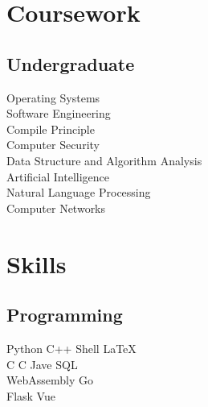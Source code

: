 \documentclass[]{resume}
\begin{document}
\begin{minipage}[t]{0.33\textwidth}
\section{Coursework}

\subsection{Undergraduate}
Operating Systems \\
Software Engineering \\
Compile Principle \\
Computer Security \\
Data Structure and Algorithm Analysis \\
Artificial Intelligence \\
Natural Language Processing \\
Computer Networks \\
\sectionsep


\section{Skills}

\subsection{Programming}
Python \textbullet{} C++ \textbullet{} Shell \textbullet{} \LaTeX\ \\
C \textbullet{} C \textbullet{} Jave \textbullet{} SQL \\
WebAssembly \textbullet{} Go \\
Flask \textbullet{} Vue \\
\sectionsep

%
%

\end{minipage} 
\hfill
\end{document}
